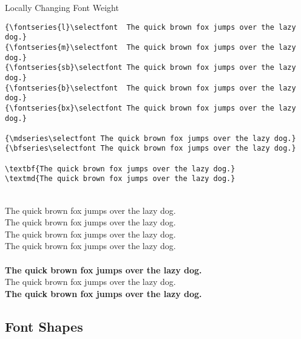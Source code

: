 \documentclass[a4paper,oneside,11pt]{article}
\begin{document}
\begin{titled-frame}
{\textsf{Locally Changing Font Weight}}
\vspace{-1em}
\begin{verbatim}
{\fontseries{l}\selectfont  The quick brown fox jumps over the lazy dog.}
{\fontseries{m}\selectfont  The quick brown fox jumps over the lazy dog.}
{\fontseries{sb}\selectfont The quick brown fox jumps over the lazy dog.}
{\fontseries{b}\selectfont  The quick brown fox jumps over the lazy dog.}
{\fontseries{bx}\selectfont The quick brown fox jumps over the lazy dog.}

{\mdseries\selectfont The quick brown fox jumps over the lazy dog.}
{\bfseries\selectfont The quick brown fox jumps over the lazy dog.}

\textbf{The quick brown fox jumps over the lazy dog.}
\textmd{The quick brown fox jumps over the lazy dog.}
\end{verbatim}

\\
{\selectfont  The quick brown fox jumps over the lazy dog.}\\
{\selectfont  The quick brown fox jumps over the lazy dog.}\\
{\selectfont  The quick brown fox jumps over the lazy dog.}\\
{\selectfont The quick brown fox jumps over the lazy dog.}\\

\\
{\bfseries\selectfont The quick brown fox jumps over the lazy dog.}\\

\noindent\textmd{The quick brown fox jumps over the lazy dog.}\\
\textbf{The quick brown fox jumps over the lazy dog.}\\
\vspace{-1em}
\end{titled-frame}




\subsection{Font Shapes}
\label{subsec:font-shapes}
\end{document}
